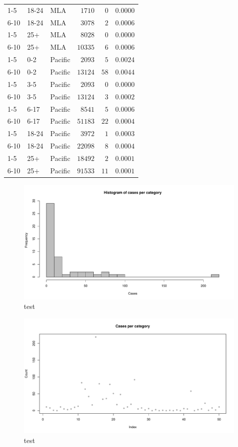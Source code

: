 \documentclass{article}
\begin{document}
\begin{table}
\begin{center}
\begin{tabular}{lllrrr}
1-5&18-24&MLA&$   1710$&$  0$&$0.0000$\tabularnewline
6-10&18-24&MLA&$   3078$&$  2$&$0.0006$\tabularnewline
1-5&25+&MLA&$   8028$&$  0$&$0.0000$\tabularnewline
6-10&25+&MLA&$  10335$&$  6$&$0.0006$\tabularnewline
1-5&0-2&Pacific&$   2093$&$  5$&$0.0024$\tabularnewline
6-10&0-2&Pacific&$  13124$&$ 58$&$0.0044$\tabularnewline
1-5&3-5&Pacific&$   2093$&$  0$&$0.0000$\tabularnewline
6-10&3-5&Pacific&$  13124$&$  3$&$0.0002$\tabularnewline
1-5&6-17&Pacific&$   8541$&$  5$&$0.0006$\tabularnewline
6-10&6-17&Pacific&$  51183$&$ 22$&$0.0004$\tabularnewline
1-5&18-24&Pacific&$   3972$&$  1$&$0.0003$\tabularnewline
6-10&18-24&Pacific&$  22098$&$  8$&$0.0004$\tabularnewline
1-5&25+&Pacific&$  18492$&$  2$&$0.0001$\tabularnewline
6-10&25+&Pacific&$  91533$&$ 11$&$0.0001$\tabularnewline
\hline
\end{tabular}\end{center}\label{table:percap}
\end{table}



\begin{figure}[h!]
\begin{center}
\includegraphics{interimreport2-015}
\end{center}
\caption{test}
\label{fig:test}
\end{figure}

\begin{figure}[h!]
\begin{center}
\includegraphics{interimreport2-016}
\end{center}
\caption{test}
\label{fig:test}
\end{figure}
\end{document}
